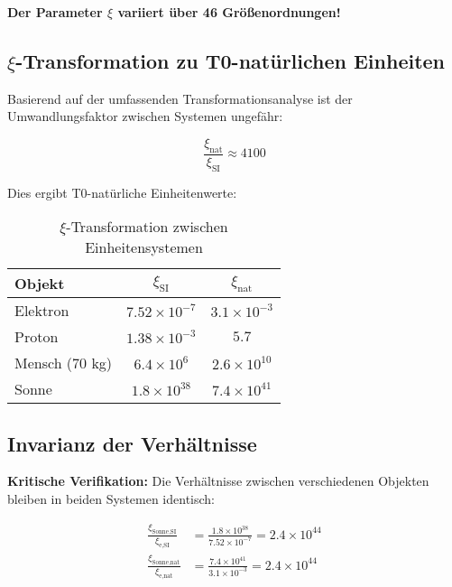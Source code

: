 \documentclass[12pt,a4paper]{article}
\newcommand{\xipar}{\xi}
\begin{document}
	\textbf{Der Parameter $\xipar$ variiert über 46 Größenordnungen!}
	
	\subsection{$\xipar$-Transformation zu T0-natürlichen Einheiten}
	\label{subsec:xi_transformation}
	
	Basierend auf der umfassenden Transformationsanalyse ist der Umwandlungsfaktor zwischen Systemen ungefähr:
	
	$$\frac{\xipar_{\text{nat}}}{\xipar_{\text{SI}}} \approx 4100$$
	
	Dies ergibt T0-natürliche Einheitenwerte:
	
	\begin{table}[htbp]
		\centering
		\begin{tabular}{lcc}
			\toprule
			\textbf{Objekt} & \textbf{$\xipar_{\text{SI}}$} & \textbf{$\xipar_{\text{nat}}$} \\
			\midrule
			Elektron & $7.52 \times 10^{-7}$ & $3.1 \times 10^{-3}$ \\
			Proton & $1.38 \times 10^{-3}$ & $5.7$ \\
			Mensch (70 kg) & $6.4 \times 10^{6}$ & $2.6 \times 10^{10}$ \\
			Sonne & $1.8 \times 10^{38}$ & $7.4 \times 10^{41}$ \\
			\bottomrule
		\end{tabular}
		\caption{$\xipar$-Transformation zwischen Einheitensystemen}
		\label{tab:xi_transformation}
	\end{table}
	
	\subsection{Invarianz der Verhältnisse}
	\label{subsec:xi_verhaeltnis_invarianz}
	
	\textbf{Kritische Verifikation:} Die Verhältnisse zwischen verschiedenen Objekten bleiben in beiden Systemen identisch:
	
	\begin{align}
		\frac{\xipar_{\text{Sonne},\text{SI}}}{\xipar_{\text{e},\text{SI}}} &= \frac{1.8 \times 10^{38}}{7.52 \times 10^{-7}} = 2.4 \times 10^{44} \\
		\frac{\xipar_{\text{Sonne},\text{nat}}}{\xipar_{\text{e},\text{nat}}} &= \frac{7.4 \times 10^{41}}{3.1 \times 10^{-3}} = 2.4 \times 10^{44}
	\end{align}
	
\end{document}
